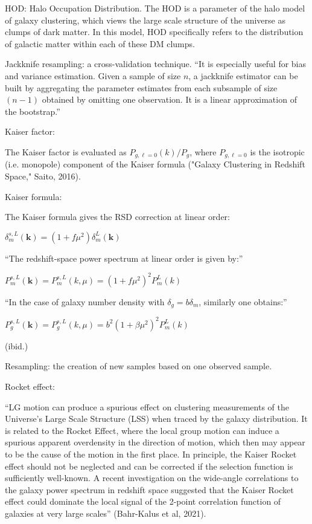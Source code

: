 \documentclass[11pt]{article}
\begin{document}
HOD: Halo Occupation Distribution. The HOD is a parameter of the halo model of
galaxy clustering, which views the large scale structure of the universe as
clumps of dark matter. In this model, HOD specifically refers to the
distribution of galactic matter within each of these DM clumps.

Jackknife resampling: a cross-validation technique. ``It is especially useful
for bias and variance estimation. Given a sample of size $n$, a jackknife
estimator can be built by aggregating the parameter estimates from each
subsample of size $(n - 1)$ obtained by omitting one observation. It is a
linear approximation of the bootstrap.''

Kaiser factor:

The Kaiser factor is evaluated as $P_{g, \ell=0} (k) / P_g$, where
$P_{g, \ell=0}$ is the isotropic (i.e. monopole) component of the Kaiser
formula ("Galaxy Clustering in Redshift Space," Saito, 2016).

Kaiser formula:

The Kaiser formula gives the RSD correction at linear order:

$\delta_m^{s, L} (\bm{k}) = (1 + f \mu^2) \delta_m^L (\bm{k})$

``The redshift-space power spectrum at linear order is given by:''

$P_m^{s, L} (\bm{k}) = P_m^{s, L} (k, \mu) = (1 + f \mu^2)^2 P_m^L (k)$

``In the case of galaxy number density with $\delta_g = b \delta_m$, similarly
one obtains:''

$
P_g^{s, L} (\bm{k})
=
P_g^{s, L} (k, \mu)
=
b^2 (1 + \beta \mu^2)^2 P_m^L (k)
$

(ibid.)

Resampling: the creation of new samples based on one observed sample.

Rocket effect:

``LG motion can produce a spurious effect on clustering measurements of the
Universe’s Large Scale Structure (LSS) when traced by the galaxy distribution.
It is related to the Rocket Effect, where the local group motion can induce a
spurious apparent overdensity in the direction of motion, which then may appear
to be the cause of the motion in the first place. In principle, the Kaiser
Rocket effect should not be neglected and can be corrected if the selection
function is sufficiently well-known. A recent investigation on the wide-angle
correlations to the galaxy power spectrum in redshift space suggested that the
Kaiser Rocket effect could dominate the local signal of the 2-point correlation
function of galaxies at very large scales'' (Bahr-Kalus et al, 2021).
\end{document}
